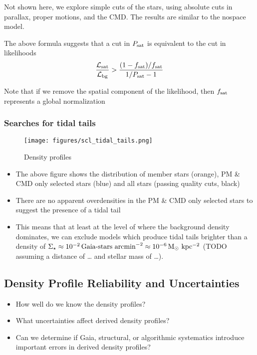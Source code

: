 Not shown here, we explore simple cuts of the stars, using absolute cuts
in parallax, proper motions, and the CMD. The results are similar to the
nospace model.

The above formula suggests that a cut in \(P_{\rm sat}\) is equivalent
to the cut in likelihoods \[
\frac{{\cal L}_{\rm sat}}{{\cal L}_{\rm bg}} > \frac{(1-f_{\rm sat})/f_{\rm sat}}{1/P_{\rm sat}- 1}
\]

Note that if we remove the spatial component of the likelihood, then
\(f_{\rm sat}\) represents a global normalization

\subsubsection{Searches for tidal tails}\label{searches-for-tidal-tails}

\begin{figure}
\centering
\texttt{[image: figures/scl\_tidal\_tails.png]}
\caption{Density profiles}\label{fig:sculptor_tidal_tails}
\end{figure}

\begin{itemize}
\item
  The above figure shows the distribution of member stars (orange), PM
  \& CMD only selected stars (blue) and all stars (passing quality cuts,
  black)
\item
  There are no apparent overdensities in the PM \& CMD only selected
  stars to suggest the presence of a tidal tail
\item
  This means that at least at the level of where the background density
  dominates, we can exclude models which produce tidal tails brighter
  than a density of
  \(\Sigma_\star \approx 10^{-2}\,\text{Gaia-stars\ arcmin}^{-2} \approx 10^{-6} \, {\rm M_\odot\ kpc^{-2}}\)
  (TODO assuming a distance of \ldots{} and stellar mass of \ldots).
\end{itemize}

\subsection{Density Profile Reliability and
Uncertainties}\label{density-profile-reliability-and-uncertainties}

\begin{itemize}
\tightlist
\item
  How well do we know the density profiles?
\item
  What uncertainties affect derived density profiles?
\item
  Can we determine if Gaia, structural, or algorithmic systematics
  introduce important errors in derived density profiles?
\end{itemize}

